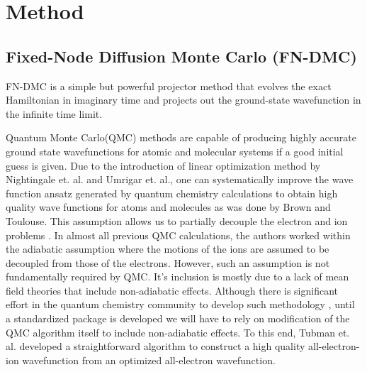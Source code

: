 \documentclass[aps,prl,superscriptaddress,groupedaddress]{revtex4}
\begin{document}
\section{Method}
\subsection{Fixed-Node Diffusion Monte Carlo (FN-DMC)}
FN-DMC is a simple but powerful projector method that evolves the exact Hamiltonian in imaginary time and projects out the ground-state wavefunction in the infinite time limit. 

Quantum Monte Carlo(QMC) methods are capable of producing highly accurate ground state wavefunctions for atomic and molecular systems if a good initial guess is given. Due to the introduction of linear optimization method by Nightingale et. al.\cite{Nightingale_Linear} and Umrigar et. al.\cite{Umrigar_Linear}, one can systematically improve the wave function ansatz generated by quantum chemistry calculations to obtain high quality wave functions for atoms and molecules as was done by Brown\cite{Brown_Bench} and Toulouse\cite{Toulouse_Bench}.  This assumption allows us to partially decouple the electron and ion problems \cite{McMahon_Review}. In almost all previous QMC calculations, the authors worked within the adiabatic assumption where the motions of the ions are assumed to be decoupled from those of the electrons. However, such an assumption is not fundamentally required by QMC. It's inclusion is mostly due to a lack of mean field theories that include non-adiabatic effects. Although there is significant effort in the quantum chemistry community to develop such methodology \cite{Sharon_NEO,Sharon_NEO1}, until a standardized package is developed we will have to rely on modification of the QMC algorithm itself to include non-adiabatic effects. To this end, Tubman et. al. \cite{Tubman_ECG} developed a straightforward algorithm to construct a high quality all-electron-ion wavefunction from an optimized all-electron wavefunction.
\end{document}
